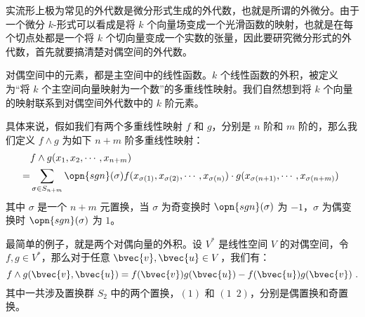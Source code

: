 实流形上极为常见的外代数是微分形式生成的外代数，也就是所谓的外微分。由于一个微分 $k$-形式可以看成是将 $k$ 个向量场变成一个光滑函数的映射，也就是在每个切点处都是一个将 $k$ 个切向量变成一个实数的张量，因此要研究微分形式的外代数，首先就要搞清楚对偶空间的外代数。

对偶空间中的元素，都是主空间中的线性函数。$k$ 个线性函数的外积，被定义为“将 $k$ 个主空间向量映射为一个数”的多重线性映射。我们自然想到将 $k$ 个向量的映射联系到对偶空间外代数中的 $k$ 阶元素。

具体来说，假如我们有两个多重线性映射 $f$ 和 $g$，分别是 $n$ 阶和 $m$ 阶的，那么我们定义 $f\wedge g$ 为如下 $n+m$ 阶多重线性映射：
\begin{equation}
\begin{aligned}
&f\wedge g(x_1, x_2, \cdots, x_{n+m})\\=
&\sum\limits_{\sigma\in S_{n+m}}\opn{sgn}(\sigma) f(x_{\sigma(1)}, x_{\sigma(2)}, \cdots, x_{\sigma(n)})\cdot g(x_{\sigma(n+1)}, \cdots, x_{\sigma(n+m)})
\end{aligned}~
\end{equation}
其中 $\sigma$ 是一个 $n+m$ 元置换，当 $\sigma$ 为奇变换时 $\opn{sgn}(\sigma)$ 为 $-1$，$\sigma$ 为偶变换时 $\opn{sgn}(\sigma)$ 为 $1$。

最简单的例子，就是两个对偶向量的外积。设 $V^*$ 是线性空间 $V$ 的对偶空间，令 $f, g\in V^*$，那么对于任意 $\bvec{v}, \bvec{u}\in V$，我们有：
\begin{equation}
f\wedge g(\bvec{v}, \bvec{u})=f(\bvec{v})g(\bvec{u})-f(\bvec{u})g(\bvec{v})~.
\end{equation}
其中一共涉及置换群 $S_2$ 中的两个置换，$(1)$ 和 $(1\phantom{2}2)$，分别是偶置换和奇置换。
